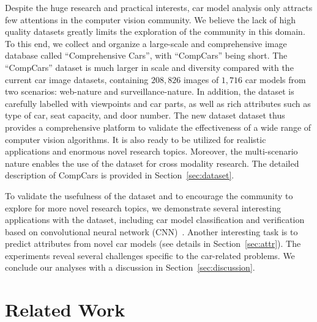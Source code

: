 \documentclass[10pt,twocolumn,letterpaper]{article}
\newcommand{\datasetName}{CompCars}
\begin{document}
Despite the huge research and practical interests, car model analysis only attracts few attentions in the computer vision community.
%
We believe the lack of high quality datasets greatly limits the exploration of the community in this domain.
%
To this end, we collect and organize a large-scale and comprehensive image database called ``Comprehensive Cars'', with ``CompCars'' being short.
%
The ``CompCars'' dataset is much larger in scale and diversity compared with the current car image datasets, containing $208,826$ images of $1,716$ car models from two scenarios: web-nature and surveillance-nature.
%
In addition, the dataset is carefully labelled with viewpoints and car parts, as well as rich attributes such as type of car, seat capacity, and door number.
%
%
The new dataset dataset thus provides a comprehensive platform to validate the effectiveness of a wide range of computer vision algorithms. It is also ready to be utilized for realistic applications and enormous novel research topics. Moreover, the multi-scenario nature enables the use of the dataset for cross modality research. The detailed description of \datasetName{} is provided in Section~\ref{sec:dataset}.


To validate the usefulness of the dataset and to encourage the community to explore for more novel research topics, we demonstrate several interesting applications with the dataset, including car model classification and verification based on convolutional neural network (CNN)~\cite{Lecun1989}. Another interesting task is to predict attributes from novel car models (see details in Section~\ref{sec:attr}). The experiments reveal several challenges specific to the car-related problems.
%
We conclude our analyses with a discussion in Section~\ref{sec:discussion}.



\section{Related Work}

\end{document}
